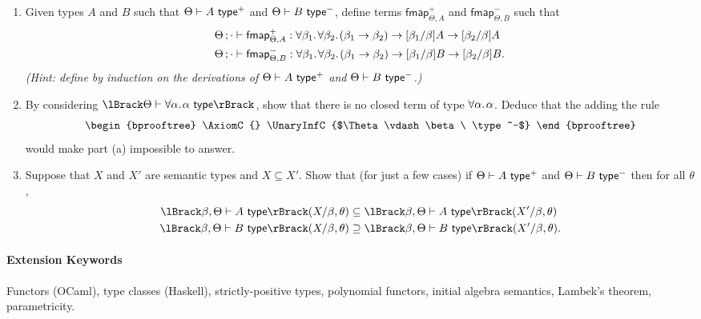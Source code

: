 \documentclass[11pt,a4paper,twoside]{article}
\begin{document}
\begin{enumerate}[label=(\alph*)]
  \item Given types $A$ and $B$ such that $\Theta \vdash A\ \mathsf{type}^+$ and $\Theta \vdash B\ \mathsf{type}^-$,
  define terms $\mathsf{fmap}^+_{\Theta, A}$ and $\mathsf{fmap}^-_{\Theta, B}$ such that
    \begin{align*}
      \Theta \, ; \cdot &\vdash \mathsf{fmap}^+_{\Theta, A} : 
        \forall \beta_1 .\;\! \forall \beta_2 .\;\! (\beta_1 \to \beta_2) \to [\beta_1 / \beta] A \to [\beta_2 / \beta] A \\
      \Theta \, ; \cdot &\vdash \mathsf{fmap}^-_{\Theta, B} : 
        \forall \beta_1 .\;\! \forall \beta_2 .\;\! (\beta_1 \to \beta_2) \to [\beta_1 / \beta] B \to [\beta_2 / \beta] B.
    \end{align*}
  \emph{(Hint: define by induction on the derivations of $\Theta \vdash A\ \mathsf{type}^+$ and $\Theta \vdash B\ \mathsf{type}^-$.)}

  \item By considering $\sem{\Theta \vdash \fora{\alpha}{\alpha}\ \type}$, 
  show that there is no closed term of type $\forall \alpha .\;\! \alpha$.
  Deduce that the adding the rule
  \[
    \begin{bprooftree}
      \AxiomC{}
      \UnaryInfC{$\Theta \vdash \beta\ \type^-$}
    \end{bprooftree}
  \]
  would make part (a) impossible to answer.

  \item Suppose that $X$ and $X'$ are semantic types and $X \subseteq X'$.
  Show that (for just a few cases) if $\Theta \vdash A\ \mathsf{type}^+$ and $\Theta \vdash B\ \mathsf{type}^-$ then for all $\theta$,
    \begin{align*}
      \sem{\beta, \Theta \vdash A\ \type}(X/\beta, \theta)
        & \subseteq
      \sem{\beta, \Theta \vdash A\ \type}(X'/\beta, \theta)
      \\
      \sem{\beta, \Theta \vdash B\ \type}(X/\beta, \theta)
        & \supseteq
      \sem{\beta, \Theta \vdash B\ \type}(X'/\beta, \theta).
    \end{align*}
\end{enumerate}

\paragraph{Extension Keywords} Functors (OCaml), type classes (Haskell), strictly-positive types, polynomial functors, initial algebra semantics, Lambek's theorem, parametricity.

\end{document}
